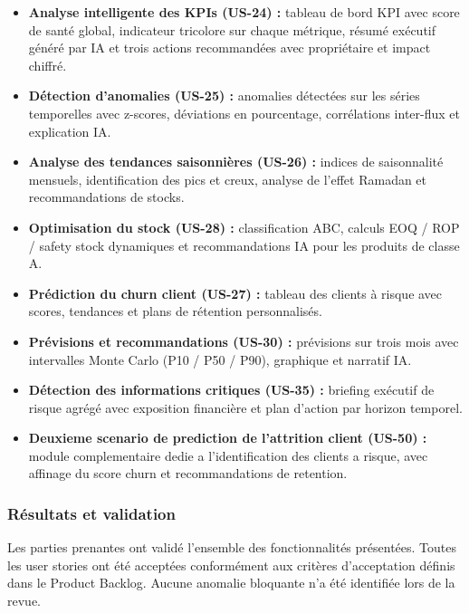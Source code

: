 \documentclass[a4paper,12pt]{report}
\begin{document}
\begin{itemize}
    \item \textbf{Analyse intelligente des KPIs (US-24) :} tableau de
    bord KPI avec score de santé global, indicateur tricolore sur chaque
    métrique, résumé exécutif généré par IA et trois actions recommandées
    avec propriétaire et impact chiffré.
 
    \item \textbf{Détection d'anomalies (US-25) :} anomalies détectées
    sur les séries temporelles avec z-scores, déviations en pourcentage,
    corrélations inter-flux et explication IA.
 
    \item \textbf{Analyse des tendances saisonnières (US-26) :} indices
    de saisonnalité mensuels, identification des pics et creux, analyse
    de l'effet Ramadan et recommandations de stocks.
 
    \item \textbf{Optimisation du stock (US-28) :} classification ABC,
    calculs EOQ / ROP / safety stock dynamiques et recommandations IA
    pour les produits de classe A.
 
    \item \textbf{Prédiction du churn client (US-27) :} tableau des
    clients à risque avec scores, tendances et plans de rétention
    personnalisés.
 
    \item \textbf{Prévisions et recommandations (US-30) :} prévisions
    sur trois mois avec intervalles Monte Carlo (P10 / P50 / P90),
    graphique et narratif IA.
 
    \item \textbf{Détection des informations critiques (US-35) :}
    briefing exécutif de risque agrégé avec exposition financière et
    plan d'action par horizon temporel.
 
    \item \textbf{Deuxieme scenario de prediction de l'attrition client (US-50) :}
    module complementaire dedie a l'identification des clients a risque,
    avec affinage du score churn et recommandations de retention.
\end{itemize}
 
\subsubsection*{Résultats et validation}
 
Les parties prenantes ont validé l'ensemble des fonctionnalités
présentées. Toutes les user stories ont été acceptées conformément aux
critères d'acceptation définis dans le Product Backlog. Aucune anomalie
bloquante n'a été identifiée lors de la revue.
 
\end{document}
